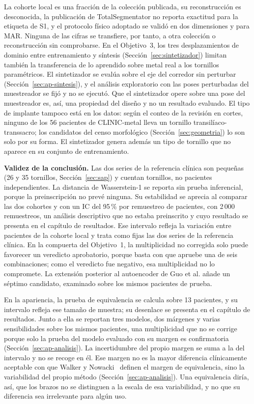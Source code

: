 La cohorte local es una fracción de la colección publicada, su reconstrucción es desconocida, la publicación de TotalSegmentator no reporta exactitud para la etiqueta de S1, y el protocolo físico adoptado se validó en dos dimensiones y para MAR. Ninguna de las cifras se transfiere, por tanto, a otra colección o reconstrucción sin comprobarse. En el Objetivo~3, los tres desplazamientos de dominio entre entrenamiento y síntesis (Sección~\ref{sec:sintetizador}) limitan también la transferencia de lo aprendido sobre metal real a los tornillos paramétricos. El sintetizador se evalúa sobre el eje del corredor sin perturbar (Sección~\ref{sec:ap-sintesis}), y el análisis exploratorio con las poses perturbadas del muestreador se fijó y no se ejecutó. Que el sintetizador opere sobre una pose del muestreador es, así, una propiedad del diseño y no un resultado evaluado. El tipo de implante tampoco está en los datos: según el conteo de la revisión en cortes, ninguno de los 56 pacientes de CLINIC-metal lleva un tornillo transilíaco-transsacro; los candidatos del censo morfológico (Sección~\ref{sec:geometria}) lo son solo por su forma. El sintetizador genera además un tipo de tornillo que no aparece en su conjunto de entrenamiento.

\textbf{Validez de la conclusión.} Las dos series de la referencia clínica son pequeñas (26 y 35 tornillos, Sección~\ref{sec:sap}) y cuentan tornillos, no pacientes independientes. La distancia de Wasserstein-1 se reporta sin prueba inferencial, porque la preinscripción no prevé ninguna. Su estabilidad se aprecia al comparar las dos cohortes y con un IC del 95\,\% por remuestreo de pacientes, con 2\,000 remuestreos, un análisis descriptivo que no estaba preinscrito y cuyo resultado se presenta en el capítulo de resultados. Ese intervalo refleja la variación entre pacientes de la cohorte local y trata como fijas las dos series de la referencia clínica. En la compuerta del Objetivo~1, la multiplicidad no corregida solo puede favorecer un veredicto aprobatorio, porque basta con que apruebe una de seis combinaciones; como el veredicto fue negativo, esa multiplicidad no lo compromete. La extensión posterior al autoencoder de Guo et al. añade un séptimo candidato, examinado sobre los mismos pacientes de prueba.

En la apariencia, la prueba de equivalencia se calcula sobre 13 pacientes, y su intervalo refleja ese tamaño de muestra; su desenlace se presenta en el capítulo de resultados. Junto a ella se reportan tres modelos, dos márgenes y varias sensibilidades sobre los mismos pacientes, una multiplicidad que no se corrige porque solo la prueba del modelo evaluado con su margen es confirmatoria (Sección~\ref{sec:ap-analisis}). La incertidumbre del propio margen se suma a la del intervalo y no se recoge en él. Ese margen no es la mayor diferencia clínicamente aceptable con que Walker y Nowacki~\cite{walker2011understanding} definen el margen de equivalencia, sino la variabilidad del propio método (Sección~\ref{sec:ap-analisis}). Una equivalencia diría, así, que los brazos no se distinguen a la escala de esa variabilidad, y no que su diferencia sea irrelevante para algún uso.

